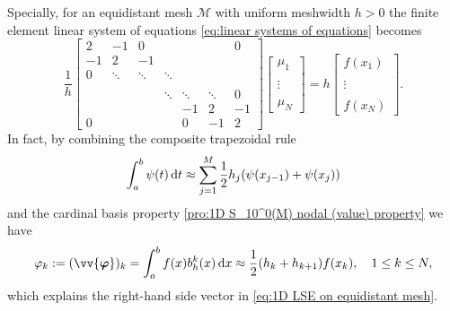 	Specially, for an equidistant mesh $\mathcal{M}$ with uniform meshwidth
	$h>0$ the finite element linear system of equations 
	\eqref{eq:linear systems of equations} becomes
	\begin{equation}\label{eq:1D LSE on equidistant mesh}
	\frac{1}{h}\begin{bmatrix} 
	2 & -1 & 0 & & & &0\\
	-1 & 2 &-1 & & & &\\
	0 &\ddots &\ddots &\ddots & & & \\
	& & & & & & \\
	& & &\ddots &\ddots &\ddots &0 \\
	& & & &-1 &2 &-1 \\
	0 & & & &0 &-1 &2
	\end{bmatrix} \begin{bmatrix}
	\mu_1\\
		\\
	\vdots\\
		\\
	\mu_N
	\end{bmatrix}=h\begin{bmatrix}
	f(x_1)\\
		\\
	\vdots\\
		\\
	f(x_N)
	\end{bmatrix}.
	\end{equation}
	In fact, by combining the composite trapezoidal rule
	\begin{equation}\label{eq:composite trapezoidal rule}
	\int_{a}^{b} \psi(t) \, \mathrm{d} t \approx 
		\sum_{j=1}^{M}\frac{1}{2}h_j(\psi(x_{j-1})+\psi(x_{j}))
	\end{equation}
	and the cardinal basis property 
	\eqref{pro:1D S_10^0(M) nodal (value) property} we have
	\begin{equation}\label{eq:1D RHS vector approx}
	\varphi_k:=(\vv{\bm{\varphi}})_k=\int_{a}^{b}f(x)b_h^k(x) \,\rd x
		\approx \frac{1}{2}(h_k+h_{k+1})f(x_k), \quad 1\leq k\leq N,
	\end{equation}
	which explains the right-hand side vector in 
	\eqref{eq:1D LSE on equidistant mesh}.\vspace{8pt}
	
